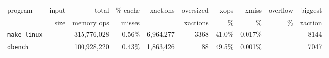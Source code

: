 \documentclass[preprint]{rdbacmconf}
\begin{document}
\appendix
{}

\begin{figure*}
\footnotesize
\begin{center}
\begin{tabular}{l@{}rrrrrrrrr}
program  & input& total      & \% cache  & xactions    & oversized & xops        & xmiss & overflow & biggest \\ 
         & size & memory ops & misses &             & xactions  &   \%        &   \%    & \% & xaction\\ \hline
\texttt{make\_linux}  &  & 315,776,028 & 0.56\%  &  6,964,277  & 3368     & 41.0\%  &  0.017\%  &            &         8144   \\
\texttt{dbench}      &  & 100,928,220 & 0.43\%  &  1,863,426  &   88     & 49.5\%  &  0.001\%  &            &         7047   \\


\end{tabular}
\end{center}
\end{figure*}
\end{document}
